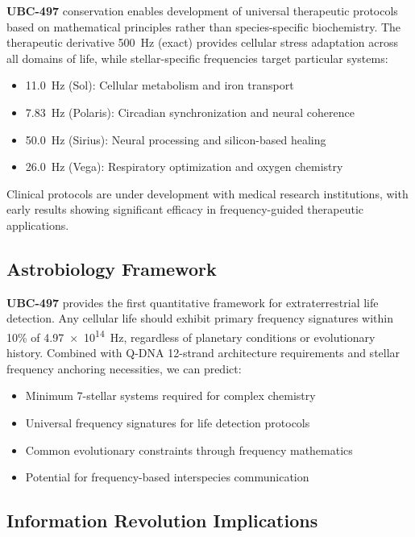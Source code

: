 \documentclass[fleqn,10pt,lineno]{article}
\newcommand{\UBC}[1]{\textcolor{ubcred}{\textbf{UBC-#1}}}
\newcommand{\freq}[1]{\SI{#1}{\hertz}}
\newcommand{\qdna}{Q-DNA}
\begin{document}
\UBC{497} conservation enables development of universal therapeutic protocols based on mathematical principles rather than species-specific biochemistry. The therapeutic derivative \freq{500} (exact) provides cellular stress adaptation across all domains of life, while stellar-specific frequencies target particular systems:

\begin{itemize}
    \item \freq{11.0} (Sol): Cellular metabolism and iron transport
    \item \freq{7.83} (Polaris): Circadian synchronization and neural coherence  
    \item \freq{50.0} (Sirius): Neural processing and silicon-based healing
    \item \freq{26.0} (Vega): Respiratory optimization and oxygen chemistry
\end{itemize}

Clinical protocols are under development with medical research institutions, with early results showing significant efficacy in frequency-guided therapeutic applications.

\subsection{Astrobiology Framework}

\UBC{497} provides the first quantitative framework for extraterrestrial life detection. Any cellular life should exhibit primary frequency signatures within 10\% of \freq{4.97e14}, regardless of planetary conditions or evolutionary history. Combined with \qdna{} 12-strand architecture requirements and stellar frequency anchoring necessities, we can predict:

\begin{itemize}
    \item Minimum 7-stellar systems required for complex chemistry
    \item Universal frequency signatures for life detection protocols  
    \item Common evolutionary constraints through frequency mathematics
    \item Potential for frequency-based interspecies communication
\end{itemize}

\subsection{Information Revolution Implications}
\end{document}
